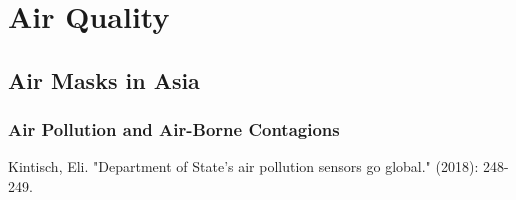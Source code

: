 \chapter{Air Quality}\label{ch:air_quality}

\section{Air Masks in Asia}

\subsection{Air Pollution and Air-Borne Contagions}


Kintisch, Eli. "Department of State's air pollution sensors go global." (2018): 248-249.